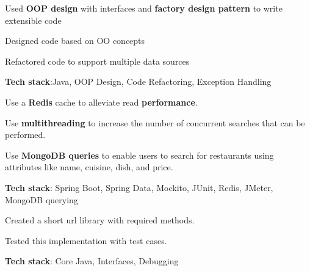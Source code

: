 \documentclass[]{deedy-resume-openfont}
\begin{document}
\begin{minipage}[t]{0.66\textwidth}

\begin{tightemize}
\item Used \textbf{OOP design} with interfaces and \textbf{factory design pattern } to write extensible code
\item Designed code based on OO concepts
\item Refactored code to support multiple data sources
\item \textbf{Tech stack}:Java, OOP Design, Code Refactoring, Exception Handling
\end{tightemize}


\begin{tightemize}
\item Use a \textbf{Redis} cache to alleviate read \textbf{performance}.
\item Use \textbf{multithreading} to increase the number of concurrent searches that can be performed.
\item Use \textbf{MongoDB queries} to enable users to search for restaurants using attributes like name, cuisine, dish, and price.

\item \textbf{Tech stack}: Spring Boot, Spring Data, Mockito, JUnit, Redis, JMeter, MongoDB querying
\end{tightemize}



\begin{tightemize}
\item Created a short url library with required methods.
\item Tested this implementation with test cases.
\item \textbf{Tech stack}: Core Java, Interfaces, Debugging
\end{tightemize}




\sectionsep









\end{minipage} 
\end{document}

